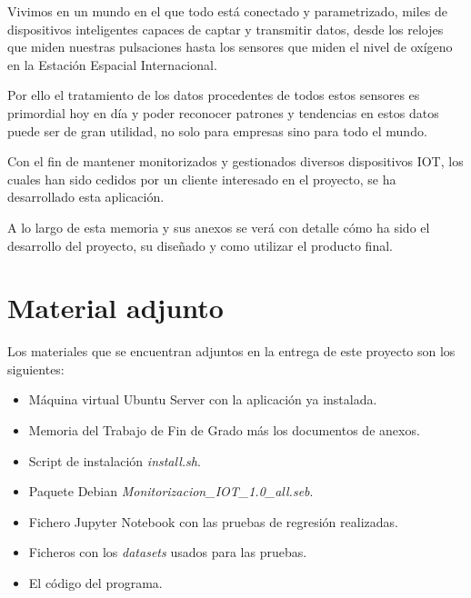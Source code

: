 

Vivimos en un mundo en el que todo está conectado y parametrizado, miles de dispositivos inteligentes capaces de captar y transmitir datos, desde los relojes que miden nuestras pulsaciones hasta los sensores que miden el nivel de oxígeno en la Estación Espacial Internacional.

Por ello el tratamiento de los datos procedentes de todos estos sensores es primordial hoy en día y poder reconocer patrones y tendencias en estos datos puede ser de gran utilidad, no solo para empresas sino para todo el mundo.

Con el fin de mantener monitorizados y gestionados diversos dispositivos IOT, los cuales han sido cedidos por un cliente interesado en el proyecto, se ha desarrollado esta aplicación.

A lo largo de esta memoria y sus anexos se verá con detalle cómo ha sido el desarrollo del proyecto, su diseñado y como utilizar el producto final. 

\section{Material adjunto}
Los materiales que se encuentran adjuntos en la entrega de este proyecto son los siguientes:
\begin{itemize}
    \item Máquina virtual Ubuntu Server con la aplicación ya instalada.
    \item Memoria del Trabajo de Fin de Grado más los documentos de anexos.
    \item Script de instalación \textit{install.sh}.
    \item Paquete Debian \textit{Monitorizacion\_IOT\_1.0\_all.seb}.
    \item Fichero Jupyter Notebook con las pruebas de regresión realizadas.
    \item Ficheros con los \textit{datasets} usados para las pruebas.
    \item El código del programa.
\end{itemize}
